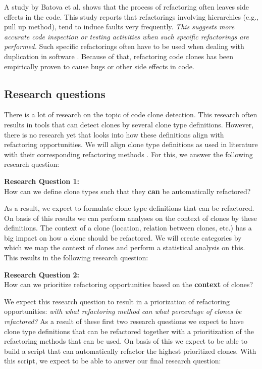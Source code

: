 A study by Batova et al. \cite{bavota2012does} shows that the process of refactoring often leaves side effects in the code. This study reports that refactorings involving hierarchies (e.g., pull up method), tend to induce faults very frequently. \textit{This suggests more accurate code inspection or testing activities when such specific refactorings are performed.} Such specific refactorings often have to be used when dealing with duplication in software \cite{fowler2018refactoring, fontana2015duplicated}. Because of that, refactoring code clones has been empirically proven to cause bugs or other side effects in code.

\subsection{Research questions}
There is a lot of research on the topic of code clone detection. This research often results in tools that can detect clones by several clone type definitions. However, there is no research yet that looks into how these definitions align with refactoring opportunities. We will align clone type definitions as used in literature \cite{roy2007survey} with their corresponding refactoring methods \cite{fowler2018refactoring}. For this, we answer the following research question:
\begin{displayquote}
\textbf{Research Question 1:}\\How can we define clone types such that they \textbf{can} be automatically refactored?
\end{displayquote}
As a result, we expect to formulate clone type definitions that can be refactored. On basis of this results we can perform analyses on the context of clones by these definitions. The context of a clone (location, relation between clones, etc.) has a big impact on how a clone should be refactored. We will create categories by which we map the context of clones and perform a statistical analysis on this. This results in the following research question:
\begin{displayquote}
\textbf{Research Question 2:}\\How can we prioritize refactoring opportunities based on the \textbf{context} of clones?
\end{displayquote}
We expect this research question to result in a priorization of refactoring opportunities: \textit{with what refactoring method can what percentage of clones be refactored?} As a result of these first two research questions we expect to have clone type definitions that can be refactored together with a prioritization of the refactoring methods that can be used. On basis of this we expect to be able to build a script that can automatically refactor the highest prioritized clones. With this script, we expect to be able to answer our final research question:
